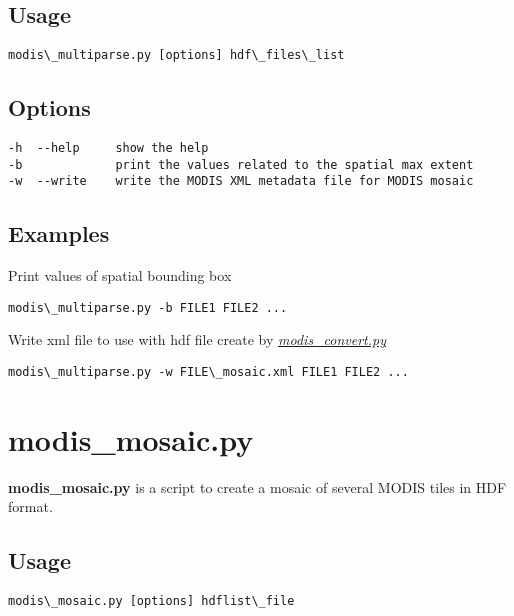 \documentclass[a4paper,11pt,oneside]{sphinxmanual}
\begin{document}
\subsection{Usage}
\label{scripts/modis_multiparse:usage}
\begin{Verbatim}[commandchars=\\\{\}]
modis\_multiparse.py [options] hdf\_files\_list
\end{Verbatim}


\subsection{Options}
\label{scripts/modis_multiparse:options}
\begin{Verbatim}[commandchars=\\\{\}]
-h  --help     show the help
-b             print the values related to the spatial max extent
-w  --write    write the MODIS XML metadata file for MODIS mosaic
\end{Verbatim}


\subsection{Examples}
\label{scripts/modis_multiparse:examples}
Print values of spatial bounding box

\begin{Verbatim}[commandchars=\\\{\}]
modis\_multiparse.py -b FILE1 FILE2 ...
\end{Verbatim}

Write xml file to use with hdf file create by {\hyperref[scripts/modis_convert::doc]{\emph{modis\_convert.py}}}

\begin{Verbatim}[commandchars=\\\{\}]
modis\_multiparse.py -w FILE\_mosaic.xml FILE1 FILE2 ...
\end{Verbatim}
\newpage %

\section{modis\_mosaic.py}
\label{scripts/modis_mosaic:modis-mosaic-py}\label{scripts/modis_mosaic::doc}
\textbf{modis\_mosaic.py} is a script to create a mosaic of several MODIS tiles
in HDF format.


\subsection{Usage}
\label{scripts/modis_mosaic:usage}
\begin{Verbatim}[commandchars=\\\{\}]
modis\_mosaic.py [options] hdflist\_file
\end{Verbatim}
\end{document}
